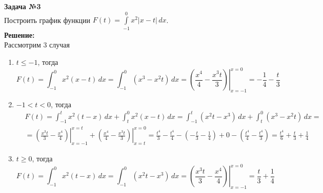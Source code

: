 \textbf{\large Задача №3}\\
\hspace*{0.5cm}Построить график функции $F(t) = \int\limits_{-1}^0 x^2 |x-t|\,dx$.\\[0.5cm]
\textbf{Решение:}\\
\hspace*{0.5cm}
Рассмотрим 3 случая
\begin{enumerate}
	\item $t \leqslant -1$, тогда
	\[F(t) = \int_{-1}^0 x^2(x-t)\, dx = \int_{-1}^0 (x^3 - x^2t)\,dx = \left.\left(\frac{x^4}{4} - \frac{x^3t}{3} \right)\right|_{x=-1}^{x=0} = -\frac14-\frac t3\]
	
	\item $-1<t<0$, тогда
	\[\begin{aligned}
		&F(t) = \int_{-1}^tx^2(t-x)\,dx + \int_t^0 x^2 (x-t) \,dx = \int_{-1}^t(x^2t-x^3)\,dx + \int_t^0(x^3-x^2t)\,dx = {}\\
		{}&= \left.\left(\frac{x^3t}{3} - \frac{x^4}{4} \right)\right|_{x=-1}^{x=t} + \left.\left(\frac{x^4}{4} - \frac{x^3t}{3} \right)\right|_{x=t}^{x=0} = \frac{t^4}{3}-\frac{t^4}{4} - \left(-\frac t3 - \frac14\right) + 0 - \left(\frac{t^4}{4} - \frac{t^4}{3}\right) = \frac{t^4}{6} + \frac{t}{3} + \frac{1}{4}
	\end{aligned}\]
	
	\item $t \geqslant 0$, тогда
	\[F(t) = \int_{-1}^0 x^2(t-x)\, dx = \int_{-1}^0 (x^2t - x^3)\,dx = \left.\left(\frac{x^3t}{3} - \frac{x^4}{4} \right)\right|_{x=-1}^{x=0} = \frac t3 + \frac14\]
\end{enumerate}

